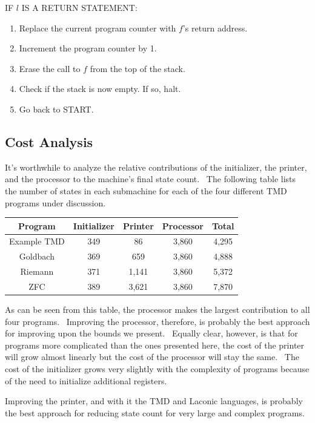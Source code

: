 \documentclass[11pt]{article}
\newcommand{\statenum}{7,870 }
\newcommand{\gbstatenum}{4,888 }
\newcommand{\rmstatenum}{5,372 }
\begin{document}
\noindent IF $l$ IS A RETURN STATEMENT:
\begin{enumerate}
\item Replace the current program counter with $f$'s return address.
\item Increment the program counter by 1.
\item Erase the call to $f$ from the top of the stack.
\item Check if the stack is now empty. If so, halt.
\item Go back to START.
\end{enumerate}

\subsection{Cost Analysis} \label{sec:cost}

It's worthwhile to analyze the relative contributions of the initializer, the printer, and the processor to the machine's final state count. \ The following table lists the number of states in each submachine for each of the four different TMD programs under discussion.

\begin{center}
    \begin{tabular}{||c c c c c||}
    \hline
    Program & Initializer & Printer & Processor & Total \\ [0.5ex]
    \hline\hline
    Example TMD & 349 & 86 & 3,860 & 4,295 \\
    \hline
    Goldbach & 369 & 659 & 3,860 & \gbstatenum \\
    \hline
    Riemann & 371 & 1,141 & 3,860 & \rmstatenum \\
    \hline
    ZFC & 389 & 3,621 & 3,860 & \statenum \\
    \hline
    \end{tabular}
\end{center}

As can be seen from this table, the processor makes the largest contribution to all four programs. \ Improving the processor, therefore, is probably the best approach for improving upon the bounds we present. \ Equally clear, however, is that for programs more complicated than the ones presented here, the cost of the printer will grow almost linearly but the cost of the processor will stay the same. \ The cost of the initializer grows very slightly with the complexity of programs because of the need to initialize additional registers.

Improving the printer, and with it the TMD and Laconic languages, is probably the best approach for reducing state count for very large and complex programs.
\end{document}
